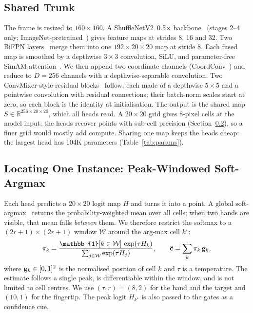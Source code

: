 \subsection{Shared Trunk}\label{sec:trunk}
The frame is resized to $160\times160$. A ShuffleNetV2~0.5$\times$ backbone~\cite{ma2018shufflenet} (stages 2--4 only; ImageNet-pretrained~\cite{deng2009imagenet}) gives feature maps at strides 8, 16 and 32. Two BiFPN layers~\cite{tan2020efficientdet} merge them into one $192\times20\times20$ map at stride 8. Each fused map is smoothed by a depthwise $3\times3$ convolution, SiLU, and parameter-free SimAM attention~\cite{yang2021simam}. We then append two coordinate channels (CoordConv~\cite{liu2018coordconv}) and reduce to $D{=}256$ channels with a depthwise-separable convolution. Two ConvMixer-style residual blocks~\cite{trockman2023patches} follow, each made of a depthwise $5\times5$ and a pointwise convolution with residual connections; their batch-norm scales start at zero, so each block is the identity at initialisation. The output is the shared map $S\in\mathbb{R}^{256\times20\times20}$, which all heads read. A $20\times20$ grid gives 8-pixel cells at the model input; the heads recover points with sub-cell precision (Section~\ref{sec:softargmax}), so a finer grid would mostly add compute. Sharing one map keeps the heads cheap: the largest head has 104K parameters (Table~\ref{tab:params}).

\subsection{Locating One Instance: Peak-Windowed Soft-Argmax}\label{sec:softargmax}
Each head predicts a $20\times20$ logit map $H$ and turns it into a point. A global soft-argmax~\cite{sun2018integral} returns the probability-weighted mean over all cells; when two hands are visible, that mean falls \emph{between} them. We therefore restrict the softmax to a $(2r{+}1)\times(2r{+}1)$ window $\mathcal{W}$ around the arg-max cell $k^\star$:
\begin{equation}
\pi_k=\frac{\mathbb{1}[k\in\mathcal{W}]\,\exp(\tau H_k)}{\sum_{j\in\mathcal{W}}\exp(\tau H_j)},\qquad
\hat{\vect{c}}=\sum_k \pi_k\,\cell_k ,
\label{eq:softargmax}
\end{equation}
where $\mathbf{g}_k\in[0,1]^2$ is the normalised position of cell $k$ and $\tau$ is a temperature. The estimate follows a single peak, is differentiable within the window, and is not limited to cell centres. We use $(\tau,r)=(8,2)$ for the hand and the target and $(10,1)$ for the fingertip. The peak logit $H_{k^\star}$ is also passed to the gates as a confidence cue.

